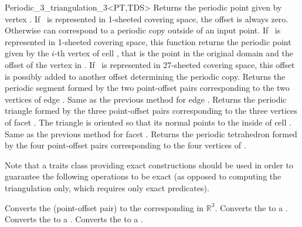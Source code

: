 \begin{ccRefClass}{Periodic_3_triangulation_3<PT,TDS>}
{Returns the periodic point given by vertex . If \ccVar\ is
  represented in 1-sheeted covering space, the offset is always
  zero. Otherwise  can correspond to a periodic copy outside
   of an input point.}
\ccGlue
{}
{If \ccVar\ is represented in 1-sheeted covering space, this function
  returns the periodic point given by the $i$-th vertex of cell
  , that is the point in the original domain and the offset of
  the vertex in .
  If \ccVar\ is represented in 27-sheeted covering space,
  this offset is possibly added to another offset determining the periodic copy.
}
\ccGlue
{} 
{Returns the periodic segment formed by the two point-offset pairs
  corresponding to the two vertices of edge .
}
\ccGlue
{}
{Same as the previous method for edge .}
\ccGlue
{} 
{Returns the periodic triangle formed by the three point-offset pairs
  corresponding to the three vertices of facet
. The triangle is oriented so that its normal points to the
inside of cell .
}
\ccGlue
{}
{Same as the previous method for facet .}
\ccGlue
{}
{Returns the periodic tetrahedron formed by the four point-offset pairs
  corresponding to the four vertices of .}

Note that a traits class providing exact constructions should be used
in order to guarantee the following operations to be exact (as opposed
to computing the triangulation only, which requires only exact
predicates).

{Converts the   (point-offset pair) to the
  corresponding  in $\mathbb R^3$.}
\ccGlue
{}
{Converts the   to a .}
\ccGlue
{}
{Converts the   to a .}
\ccGlue
{}
{Converts the   to a .}


\end{ccRefClass}
